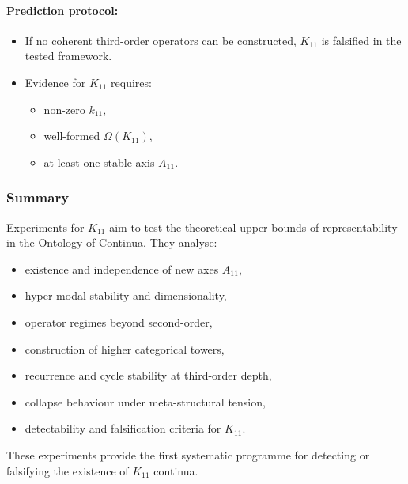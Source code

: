 \paragraph{Prediction protocol:}

\begin{itemize}
    \item If no coherent third-order operators can be constructed,
          $K_{11}$ is falsified in the tested framework.
    \item Evidence for $K_{11}$ requires:
          \begin{itemize}
              \item non-zero $k_{11}$,
              \item well-formed $\Omega(K_{11})$,
              \item at least one stable axis $A_{11}$.
          \end{itemize}
\end{itemize}



\subsubsection{Summary}

Experiments for $K_{11}$ aim to test the theoretical upper bounds of
representability in the Ontology of Continua.
They analyse:

\begin{itemize}
    \item existence and independence of new axes $A_{11}$,
    \item hyper-modal stability and dimensionality,
    \item operator regimes beyond second-order,
    \item construction of higher categorical towers,
    \item recurrence and cycle stability at third-order depth,
    \item collapse behaviour under meta-structural tension,
    \item detectability and falsification criteria for $K_{11}$.
\end{itemize}

These experiments provide the first systematic programme for detecting
or falsifying the existence of $K_{11}$ continua.
